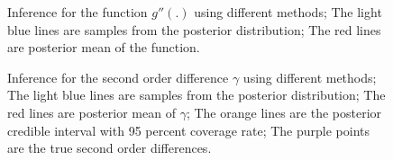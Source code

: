 \documentclass{article}
\begin{document}
\begin{figure}[p]
{    }
    \caption{Inference for the function $g''(.)$ using different methods; The light blue lines are samples from the posterior distribution; The red lines are posterior mean of the function.}
    \label{fig:sim2func_2deriv}
\end{figure}


\begin{figure}[p]
    \centering
    \caption{Inference for the second order difference $\gamma$ using different methods; The light blue lines are samples from the posterior distribution; The red lines are posterior mean of $\gamma$; The orange lines are the posterior credible interval with 95 percent coverage rate; The purple points are the true second order differences.}
    \label{fig:sim2SecondDifference}
\end{figure}
\end{document}
